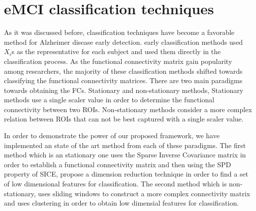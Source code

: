 \documentclass[journal]{IEEEtran}
\begin{document}
	
	\section{eMCI classification techniques}

	As it was discussed before, classification techniques have become a favorable method for Alzheimer disease early detection. early classification methods used $X_{i}$s as the representative for each subject and used them directly in the classification process. 
	As the functional connectivity matrix gain popularity among researchers, the majority of these classification methods shifted towards classifying the functional connectivity matrices. There are two main paradigms towards obtaining the FCs. Stationary and non-stationary methods, Stationary methods use a single scaler value in order to determine the functional connectivity between two ROIs. Non-stationary methods consider a more complex relation between ROIs that can not be best captured with a single scaler value. 
	    
	In order to demonstrate the power of our proposed framework, we have implemented an state of the art method from each of these paradigms. The first method which is an stationary one uses the Sparse Inverse Covariance matrix in order to establish a functional connectivity matrix and then using the SPD property of SICE, propose a dimension reduction technique in order to find a set of low dimensional features for classification. The second method which is non-stationary, uses sliding windows to  construct a more complex connectivity matrix and uses clustering in order to obtain low dimensial features for classification.     
\end{document}
